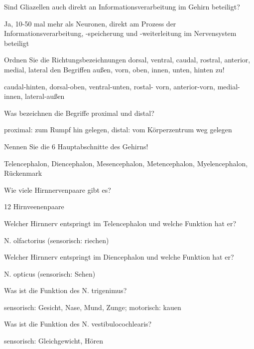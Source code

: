 \documentclass[10pt, a4paper]{exam}
\begin{document}
\begin{questions}
  \question Sind Gliazellen auch direkt an Informationsverarbeitung im Gehirn beteiligt?
  \begin{solution}
    Ja, 10-50 mal mehr als Neuronen, direkt am Prozess der Informationsverarbeitung, -speicherung und -weiterleitung im Nervensystem beteiligt
  \end{solution}

  \question Ordnen Sie die Richtungsbezeichnungen dorsal, ventral, caudal, rostral, anterior, medial, lateral den Begriffen außen, vorn, oben, innen, unten, hinten zu!
  \begin{solution}
    caudal-hinten, dorsal-oben, ventral-unten, rostal- vorn, anterior-vorn, medial-innen, lateral-außen
  \end{solution}

  \question Was bezeichnen die Begriffe proximal und distal?
  \begin{solution}
    proximal: zum Rumpf hin gelegen, distal: vom Körperzentrum weg gelegen
  \end{solution}

  \question Nennen Sie die 6 Hauptabschnitte des Gehirns!
  \begin{solution}
    Telencephalon, Diencephalon, Mesencephalon, Metencephalon, Myelencephalon, Rückenmark
  \end{solution}

  \question Wie viele Hirnnervenpaare gibt es?
  \begin{solution}
    12 Hirnveenenpaare
  \end{solution}

  \question Welcher Hirnnerv entspringt im Telencephalon und welche Funktion hat er?
  \begin{solution}
    N. olfactorius (sensorisch: riechen)
  \end{solution}

  \question Welcher Hirnnerv entspringt im Diencephalon und welche Funktion hat er?
  \begin{solution}
    N. opticus (sensorisch: Sehen)
  \end{solution}

  \question Was ist die Funktion des N. trigenimus?
  \begin{solution}
    sensorisch: Gesicht, Nase, Mund, Zunge; motorisch: kauen
  \end{solution}

  \question Was ist die Funktion des N. vestibulocochlearis?
  \begin{solution}
    sensorisch: Gleichgewicht, Hören
  \end{solution}


\end{questions}
\end{document}
